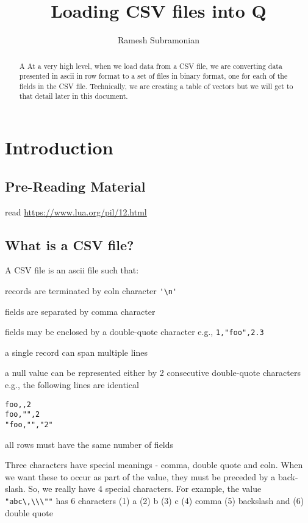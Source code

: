 \documentclass[letterpaper]{article}
\begin{document}
\title{Loading CSV files into Q}
\author{ Ramesh Subramonian }
\maketitle
\thispagestyle{fancy}
\cfoot{}
\rfoot{{\small \thepage}}


\begin{abstract}
A At a very high level, when we load data from a CSV file, we are
converting data presented in ascii in row format to a set of files in
binary format, one for each of the fields in the CSV
file. Technically, we are creating a table of vectors but we will get
to that detail later in this document.
\end{abstract}

\section{Introduction}

\subsection{Pre-Reading Material}

read \url{https://www.lua.org/pil/12.html}

\subsection{What is a CSV file?}
A CSV file is an ascii file such that:

\be
\item records are terminated by eoln character \verb+'\n'+
\item fields are separated by comma character
\item fields may be enclosed by a double-quote character 
e.g., \verb+1,"foo",2.3+
\item a single record can span multiple lines
\item a null value can be represented either by 2 consecutive 
double-quote characters e.g., the following lines are identical
\begin{verbatim}
foo,,2
foo,"",2
"foo,"","2"
\end{verbatim}
\item all rows must have the same number of fields 
\item Three characters have special meanings - comma, double quote and
  eoln. When we want these to occur as part of the value, they must be
  preceded by a back-slash. So, we really have 4 special
  characters. For example, the value \verb+ "abc\,\\\""+ has 6
  characters (1) a (2) b (3) c (4) comma (5) backslash and (6) double
  quote
\end{document}
